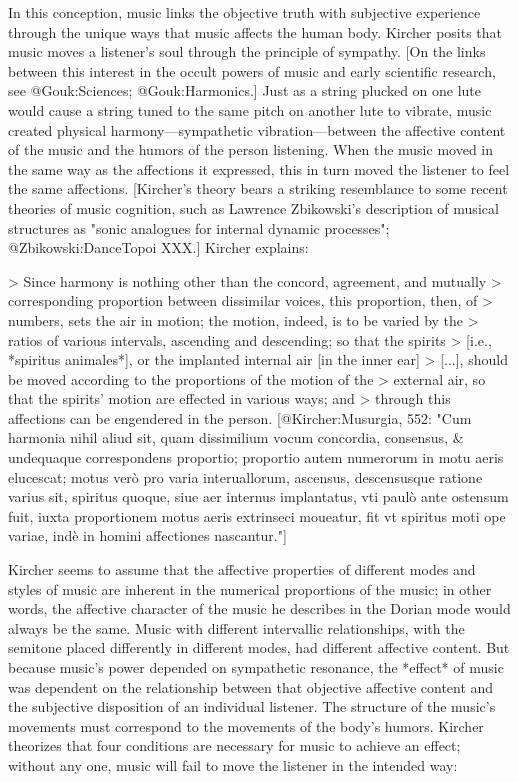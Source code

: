 In this conception, music links the objective truth with subjective experience
through the unique ways that music affects the human body. 
Kircher posits that music moves a listener's soul through the principle of
sympathy.
[On the links between this interest in the occult powers of music and early
scientific research, see @Gouk:Sciences; @Gouk:Harmonics.]
Just as a string plucked on one lute would cause a string tuned to the same
pitch on another lute to vibrate, music created physical harmony---sympathetic
vibration---between the affective content of the music and the humors of the
person listening.
When the music moved in the same way as the affections it expressed, this in
turn moved the listener to feel the same affections.
[Kircher's theory bears a striking resemblance to some recent theories of music
cognition, such as Lawrence Zbikowski's description of musical structures as
"sonic analogues for internal dynamic processes"; @Zbikowski:DanceTopoi
XXX.]
Kircher explains:

> Since harmony is nothing other than the concord, agreement, and mutually
> corresponding proportion between dissimilar voices, this proportion, then, of
> numbers, sets the air in motion; the motion, indeed, is to be varied by the
> ratios of various intervals, ascending and descending; so that the spirits 
> [i.e., *spiritus animales*], or the implanted internal air [in the inner ear]
> [...], should be moved according to the proportions of the motion of the
> external air, so that the spirits' motion are effected in various ways; and
> through this affections can be engendered in the person.
[@Kircher:Musurgia, 552: "Cum harmonia nihil aliud sit, quam dissimilium vocum
concordia, consensus, & undequaque correspondens proportio; proportio autem
numerorum in motu aeris elucescat; motus verò pro varia interuallorum, ascensus,
descensusque ratione varius sit, spiritus quoque, siue aer internus implantatus,
vti paulò ante ostensum fuit, iuxta proportionem motus aeris extrinseci
moueatur, fit vt spiritus moti ope variae, indè in homini affectiones
nascantur."]

Kircher seems to assume that the affective properties of different modes and
styles of music are inherent in the numerical proportions of the music; in other
words, the affective character of the music he describes in the Dorian mode
would always be the same.
Music with different intervallic relationships, with the semitone placed
differently in different modes, had different affective content.
But because music's power depended on sympathetic resonance, the *effect* of
music was dependent on the relationship between that objective affective content
and the subjective disposition of an individual listener.
The structure of the music's movements must correspond to the movements of the
body's humors. 
Kircher theorizes that four conditions are necessary for music to achieve an
effect; without any one, music will fail to move the listener in the intended
way:

